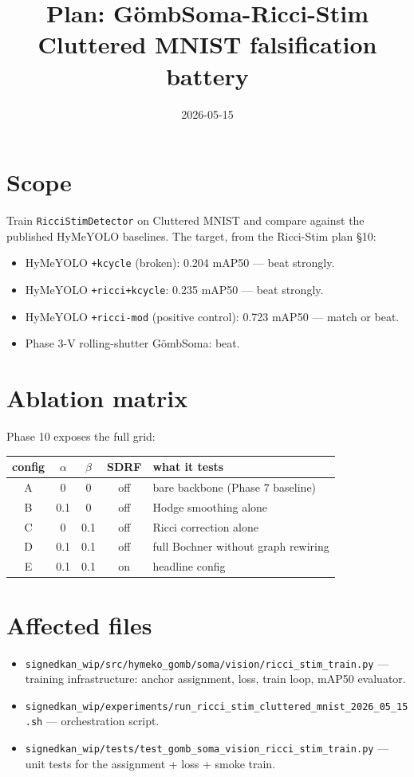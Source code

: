 \documentclass[11pt,a4paper]{article}
\title{Plan: GömbSoma-Ricci-Stim Cluttered MNIST falsification battery}
\date{2026-05-15}
\author{}
\begin{document}
\maketitle

\section{Scope}

Train \texttt{RicciStimDetector} on Cluttered MNIST and compare
against the published HyMeYOLO baselines. The target, from the
Ricci-Stim plan §10:

\begin{itemize}
\item HyMeYOLO \texttt{+kcycle} (broken): 0.204 mAP50 --- beat strongly.
\item HyMeYOLO \texttt{+ricci+kcycle}: 0.235 mAP50 --- beat strongly.
\item HyMeYOLO \texttt{+ricci-mod} (positive control): 0.723 mAP50 --- match or beat.
\item Phase 3-V rolling-shutter G\"ombSoma: beat.
\end{itemize}

\section{Ablation matrix}

Phase 10 exposes the full grid:

\begin{center}
\begin{tabular}{ccccp{6cm}}
\toprule
config & $\alpha$ & $\beta$ & SDRF & what it tests \\
\midrule
A & 0   & 0   & off & bare backbone (Phase 7 baseline) \\
B & 0.1 & 0   & off & Hodge smoothing alone \\
C & 0   & 0.1 & off & Ricci correction alone \\
D & 0.1 & 0.1 & off & full Bochner without graph rewiring \\
E & 0.1 & 0.1 & on  & headline config \\
\bottomrule
\end{tabular}
\end{center}

\section{Affected files}

\begin{itemize}
\item \texttt{signedkan\_wip/src/hymeko\_gomb/soma/vision/ricci\_stim\_train.py}
  --- training infrastructure: anchor assignment, loss, train loop, mAP50 evaluator.
\item \texttt{signedkan\_wip/experiments/run\_ricci\_stim\_cluttered\_mnist\_2026\_05\_15.sh}
  --- orchestration script.
\item \texttt{signedkan\_wip/tests/test\_gomb\_soma\_vision\_ricci\_stim\_train.py}
  --- unit tests for the assignment + loss + smoke train.
\end{itemize}
\end{document}
